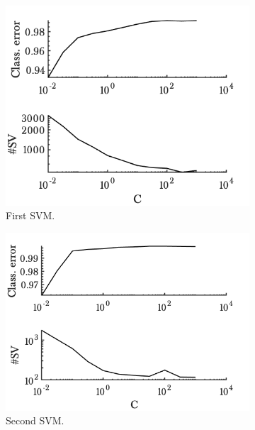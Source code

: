 \begin{figure}[h!]
        \begin{subfigure}[b]{.47\textwidth}  
            \centering 
            \includegraphics[width=.98\textwidth]{parts/chap-4/img-svm/non-lin/svm1.png}
            \caption{First SVM.} 
        \end{subfigure}
        \hfill
        \begin{subfigure}[b]{.47\textwidth}   
            \centering 
            \includegraphics[width=.98\textwidth]{parts/chap-4/img-svm/non-lin/svm2.png}
            \caption{Second SVM.} 
        \end{subfigure}
        \hfill
        \begin{subfigure}[b]{.47\textwidth}   

\end{subfigure}
\end{figure}
